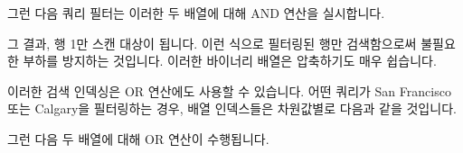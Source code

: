 \documentclass[letterpaper,10pt,english]{sphinxmanual}
\begin{document}
그런 다음 쿼리 필터는 이러한 두 배열에 대해 AND 연산을 실시합니다.

\begin{sphinxVerbatim}[commandchars=\\\{\}]
\PYG{p}{[}\PYG{p}{]}\PYG{p}{[}\PYG{p}{]}\PYG{p}{[}\PYG{p}{]}\PYG{p}{[}\PYG{p}{]}  \PYG{p}{[}\PYG{p}{]}\PYG{p}{[}\PYG{p}{]}\PYG{p}{[}\PYG{p}{]}\PYG{p}{[}\PYG{p}{]}  \PYG{p}{[}\PYG{p}{]}\PYG{p}{[}\PYG{p}{]}\PYG{p}{[}\PYG{p}{]}\PYG{p}{[}\PYG{p}{]}
\end{sphinxVerbatim}

그 결과, 행 1만 스캔 대상이 됩니다. 이런 식으로 필터링된 행만 검색함으로써 불필요한 부하를 방지하는 것입니다. 이러한 바이너리 배열은 압축하기도 매우 쉽습니다.

이러한 검색 인덱싱은 OR 연산에도 사용할 수 있습니다. 어떤 쿼리가 San Francisco 또는 Calgary을 필터링하는 경우, 배열 인덱스들은 차원값별로 다음과 같을 것입니다.

\begin{sphinxVerbatim}[commandchars=\\\{\}]
     \PYG{p}{[}\PYG{p}{]}  \PYG{p}{[}\PYG{p}{]}\PYG{p}{[}\PYG{p}{]}\PYG{p}{[}\PYG{p}{]}\PYG{p}{[}\PYG{p}{]}
    \PYG{p}{[}\PYG{p}{]}  \PYG{p}{[}\PYG{p}{]}\PYG{p}{[}\PYG{p}{]}\PYG{p}{[}\PYG{p}{]}\PYG{p}{[}\PYG{p}{]}
\end{sphinxVerbatim}

그런 다음 두 배열에 대해 OR 연산이 수행됩니다.

\begin{sphinxVerbatim}[commandchars=\\\{\}]
\PYG{p}{[}\PYG{p}{]}\PYG{p}{[}\PYG{p}{]}\PYG{p}{[}\PYG{p}{]}\PYG{p}{[}\PYG{p}{]}  \PYG{p}{[}\PYG{p}{]}\PYG{p}{[}\PYG{p}{]}\PYG{p}{[}\PYG{p}{]}\PYG{p}{[}\PYG{p}{]}  \PYG{p}{[}\PYG{p}{]}\PYG{p}{[}\PYG{p}{]}\PYG{p}{[}\PYG{p}{]}\PYG{p}{[}\PYG{p}{]}
\end{sphinxVerbatim}
\end{document}

